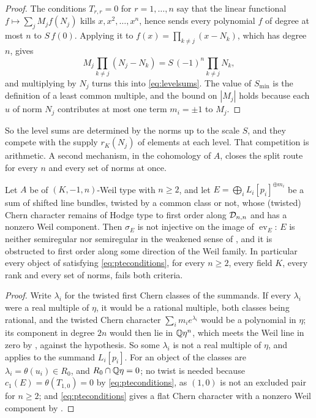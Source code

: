 \begin{proof}
The conditions $T_{r,r}=0$ for $r=1,\dots,n$ say that the linear
functional $f\mapsto\sum_{j}M_{j}f(N_{j})$ kills $x,x^{2},\dots,x^{n}$, hence
sends every polynomial $f$ of degree at most $n$ to $S\,f(0)$. Applying it to
$f(x)=\prod_{k\ne j}(x-N_{k})$, which has degree $n$, gives
\[
  M_{j}\prod_{k\ne j}(N_{j}-N_{k})=S\,(-1)^{n}\prod_{k\ne j}N_{k},
\]
and multiplying by $N_{j}$ turns this into \eqref{eq:levelsums}. The value of
$S_{\min}$ is the definition of a least common multiple, and the bound on
$|M_{j}|$ holds because each $u$ of norm $N_{j}$ contributes at most one term
$m_{i}=\pm1$ to $M_{j}$.
\end{proof}

So the level sums are determined by the norms up to the scale $S$, and they
compete with the supply $r_{K}(N_{j})$ of elements at each level. That
competition is arithmetic. A second mechanism, in the cohomology of $A$,
closes the split route for every $n$ and every set of norms at once.

\begin{corollary}\label{cor:noline}
Let $A$ be of $(K,-1,n)$-Weil type with $n\ge2$, and let
$E=\bigoplus_{i}L_{i}[p_{i}]^{\oplus m_{i}}$ be a sum of shifted line bundles,
twisted by a common class or not, whose (twisted) Chern character remains of
Hodge type to first order along $\mathcal{D}_{n,n}$ and has a nonzero Weil component.
Then $\sigma_{E}$ is not injective on the image of $\operatorname{ev}_{E}$:
$E$ is neither semiregular nor semiregular in the weakened sense of
\cite[Question 11.4]{Mar25b}, and it is obstructed to first order along some
direction of the Weil family. In particular every object of 
satisfying \eqref{eq:pteconditions}, for every $n\ge2$, every field $K$,
every rank and every set of norms, fails both criteria.
\end{corollary}

\begin{proof}
Write $\lambda_{i}$ for the twisted first Chern classes of the summands. If
every $\lambda_{i}$ were a real multiple of $\eta$, it would be a rational
multiple, both classes being rational, and the twisted Chern character
$\sum_{i}m_{i}e^{\lambda_{i}}$ would be a polynomial in $\eta$; its component
in degree $2n$ would then lie in $\mathbb{Q}\eta^{n}$, which meets the Weil line in
zero by \cite[Proposition~5.1]{paperI}, against the hypothesis. So some $\lambda_{i}$ is
not a real multiple of $\eta$, and \cite[Theorem~9.20]{paperI} applies to the
summand $L_{i}[p_{i}]$. For an object of  the classes are
$\lambda_{i}=\theta(u_{i})\in R_{0}$, and $R_{0}\cap\mathbb{Q}\eta=0$; no twist is
needed because $c_{1}(E)=\theta(T_{1,0})=0$ by \eqref{eq:pteconditions}, as
$(1,0)$ is not an excluded pair for $n\ge2$; and \eqref{eq:pteconditions}
gives a flat Chern character with a nonzero Weil component by
.
\end{proof}

